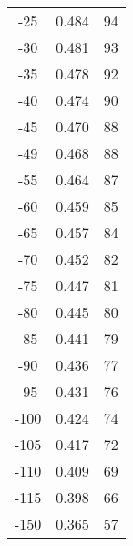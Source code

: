 \begin{table}[p]
\begin{tabular}{SSS}
		-25 & 0.484 & 94  \\
		-30 & 0.481 & 93  \\
		-35 & 0.478 & 92  \\
		-40 & 0.474 & 90  \\
		-45 & 0.470 & 88  \\
		-49 & 0.468 & 88  \\
		-55 & 0.464 & 87  \\
		-60 & 0.459 & 85  \\
		-65 & 0.457 & 84  \\
		-70 & 0.452 & 82  \\
		-75 & 0.447 & 81  \\
		-80 & 0.445 & 80  \\
		-85 & 0.441 & 79  \\
		-90 & 0.436 & 77  \\
		-95 & 0.431 & 76  \\
		-100 & 0.424 & 74  \\
		-105 & 0.417 & 72  \\
		-110 & 0.409 & 69  \\
		-115 & 0.398 & 66  \\
		-150 & 0.365 & 57  \\
		\bottomrule
	\end{tabular}
\end{table}
